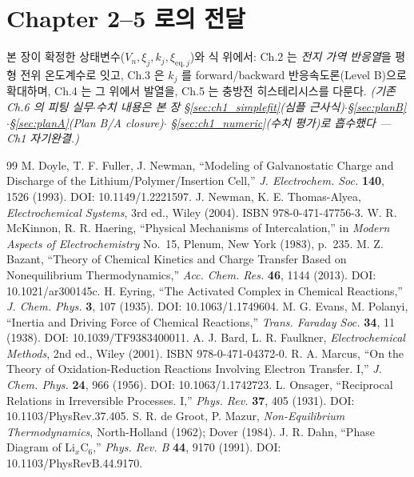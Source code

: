 \documentclass[11pt,a4paper]{article}
\newcommand{\eq}{\mathrm{eq}}
\begin{document}
\section*{Chapter 2--5 로의 전달}
본 장이 확정한 상태변수($V_n,\xi_j,k_j,\xi_{\eq,j}$)와 식 위에서: Ch.2 는 \emph{전지 가역 반응열}을 평형
전위 온도계수로 잇고, Ch.3 은 $k_j$ 를 forward/backward 반응속도론(Level B)으로 확대하며, Ch.4 는 그 위에서
발열을, Ch.5 는 충방전 히스테리시스를 다룬다. \emph{(기존 Ch.6 의 피팅 실무$\cdot$수치 내용은 본 장
\S\ref{sec:ch1_simplefit}(심플 근사식)$\cdot$\S\ref{sec:planB}$\cdot$\S\ref{sec:planA}(Plan B/A closure)$\cdot$
\S\ref{sec:ch1_numeric}(수치 평가)로 흡수했다 — Ch1 자기완결.)}

\begin{thebibliography}{99}
 M. Doyle, T. F. Fuller, J. Newman, ``Modeling of Galvanostatic Charge and Discharge
  of the Lithium/Polymer/Insertion Cell,'' \emph{J. Electrochem. Soc.} \textbf{140}, 1526 (1993).
  DOI: 10.1149/1.2221597.
 J. Newman, K. E. Thomas-Alyea, \emph{Electrochemical Systems}, 3rd ed., Wiley (2004).
  ISBN 978-0-471-47756-3.
 W. R. McKinnon, R. R. Haering, ``Physical Mechanisms of Intercalation,'' in
  \emph{Modern Aspects of Electrochemistry} No.~15, Plenum, New York (1983), p.~235.
 M. Z. Bazant, ``Theory of Chemical Kinetics and Charge Transfer Based on
  Nonequilibrium Thermodynamics,'' \emph{Acc. Chem. Res.} \textbf{46}, 1144 (2013).
  DOI: 10.1021/ar300145c.
 H. Eyring, ``The Activated Complex in Chemical Reactions,'' \emph{J. Chem. Phys.}
  \textbf{3}, 107 (1935). DOI: 10.1063/1.1749604.
 M. G. Evans, M. Polanyi, ``Inertia and Driving Force of Chemical Reactions,''
  \emph{Trans. Faraday Soc.} \textbf{34}, 11 (1938). DOI: 10.1039/TF9383400011.
 A. J. Bard, L. R. Faulkner, \emph{Electrochemical Methods}, 2nd ed., Wiley (2001).
  ISBN 978-0-471-04372-0.
 R. A. Marcus, ``On the Theory of Oxidation-Reduction Reactions Involving Electron
  Transfer. I,'' \emph{J. Chem. Phys.} \textbf{24}, 966 (1956). DOI: 10.1063/1.1742723.
 L. Onsager, ``Reciprocal Relations in Irreversible Processes. I,'' \emph{Phys. Rev.}
  \textbf{37}, 405 (1931). DOI: 10.1103/PhysRev.37.405.
 S. R. de Groot, P. Mazur, \emph{Non-Equilibrium Thermodynamics},
  North-Holland (1962); Dover (1984).
 J. R. Dahn, ``Phase Diagram of Li$_x$C$_6$,'' \emph{Phys. Rev. B} \textbf{44}, 9170
  (1991). DOI: 10.1103/PhysRevB.44.9170.

\end{thebibliography}
\end{document}
